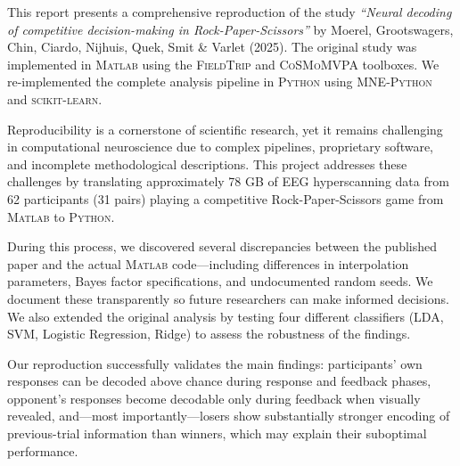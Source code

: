 \documentclass[11pt,a4paper]{article}
\newcommand{\matlab}{\textsc{Matlab}}
\newcommand{\python}{\textsc{Python}}
\newcommand{\fieldtrip}{\textsc{FieldTrip}}
\newcommand{\cosmomvpa}{\textsc{CoSMoMVPA}}
\newcommand{\mnepython}{\textsc{MNE-Python}}
\newcommand{\sklearn}{\textsc{scikit-learn}}
\begin{document}
\newpage
\begin{tcolorbox}[
  enhanced,
  colback=white,
  colframe=deepblue,
  boxrule=1pt,
  arc=2pt,
  left=12pt, right=12pt, top=10pt, bottom=10pt,
  title={\sffamily\bfseries\large Abstract},
  coltitle=white,
  colbacktitle=deepblue,
  fonttitle=\sffamily\bfseries,
  attach boxed title to top left={yshift=-2mm,xshift=10mm},
  boxed title style={colback=deepblue, arc=1pt, outer arc=1pt}
]
\small\setlength{\parskip}{6pt plus 2pt minus 1pt}
This report presents a comprehensive reproduction of the study \textit{``Neural decoding of competitive decision-making in Rock-Paper-Scissors''} by Moerel, Grootswagers, Chin, Ciardo, Nijhuis, Quek, Smit \& Varlet (2025). The original study was implemented in \matlab{} using the \fieldtrip{} and \cosmomvpa{} toolboxes. We re-implemented the complete analysis pipeline in \python{} using \mnepython{} and \sklearn{}.

Reproducibility is a cornerstone of scientific research, yet it remains challenging in computational neuroscience due to complex pipelines, proprietary software, and incomplete methodological descriptions. This project addresses these challenges by translating approximately 78 GB of EEG hyperscanning data from 62 participants (31 pairs) playing a competitive Rock-Paper-Scissors game from \matlab{} to \python{}.

During this process, we discovered several discrepancies between the published paper and the actual \matlab{} code---including differences in interpolation parameters, Bayes factor specifications, and undocumented random seeds. We document these transparently so future researchers can make informed decisions. We also extended the original analysis by testing four different classifiers (LDA, SVM, Logistic Regression, Ridge) to assess the robustness of the findings.

Our reproduction successfully validates the main findings: participants' own responses can be decoded above chance during response and feedback phases, opponent's responses become decodable only during feedback when visually revealed, and---most importantly---losers show substantially stronger encoding of previous-trial information than winners, which may explain their suboptimal performance.
\end{tcolorbox}

\end{document}
